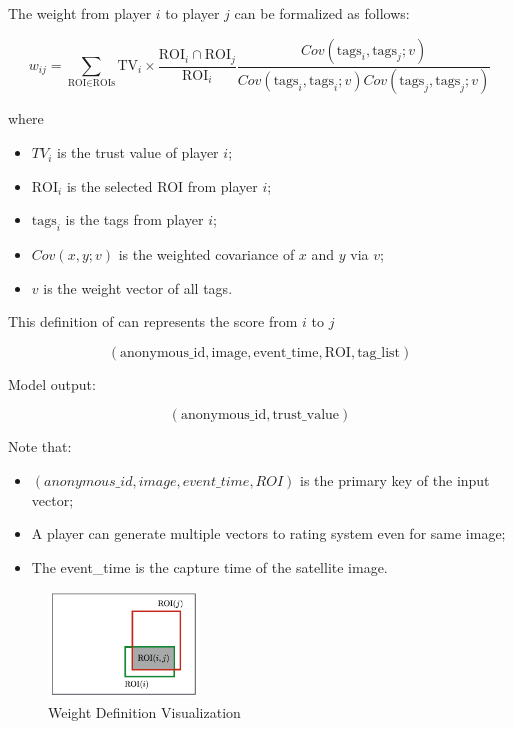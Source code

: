   \begin{definition}
  The weight from player $i$ to player $j$ can be formalized as follows:

  \begin{equation}
  w_{ij} = 
    \sum_{\text{ROI}\in\text{ROIs}}{\text{TV}_i \times
      \frac{\text{ROI}_i\cap\text{ROI}_j}{\text{ROI}_i}
      \frac{Cov(\text{tags}_i, \text{tags}_j; v)}
          {Cov(\text{tags}_i, \text{tags}_i; v)Cov(\text{tags}_j, \text{tags}_j; v)}
    }
  \end{equation}

  where 
  
  \begin{itemize}
    \item $TV_i$ is the trust value of player $i$;
    \item $\text{ROI}_i$ is the selected ROI from player $i$;
    \item $\text{tags}_i$ is the tags from player $i$;
    \item $Cov(x, y; v)$ is the weighted covariance of $x$ and $y$ via $v$;
    \item $v$ is the weight vector of all tags.
  \end{itemize}
  \end{definition}

  This definition of  can represents the score from $i$ to $j$
  
  \[
  (\text{anonymous\_id}, \text{image}, \text{event\_time}, \text{ROI}, \text{tag\_list})
  \]

  Model output: 
  
  \[
  (\text{anonymous\_id}, \text{trust\_value})
  \]

    Note that:

    \begin{itemize}
      \item $(anonymous\_id, image, event\_time, ROI)$ is the primary key of the input vector;
      \item A player can generate multiple vectors to rating system even for same image;
      \item The event\_time is the capture time of the satellite image.
    \end{itemize}

    \begin{figure}[htp]
    \centering
    \includegraphics[width=4cm]{figures/weight-define}
    \caption{Weight Definition Visualization}
    \label{fig:roiweight}
    \end{figure}


